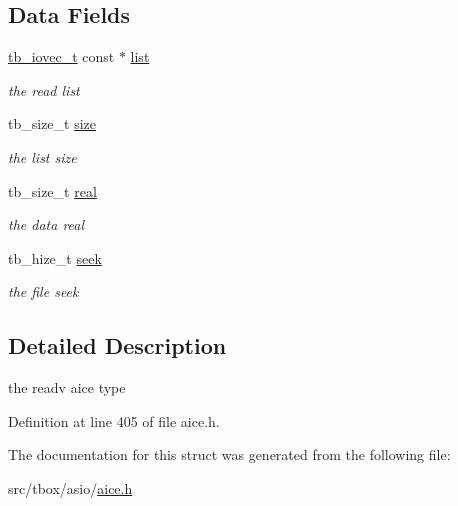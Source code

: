\subsection*{Data Fields}
\begin{DoxyCompactItemize}
\item 
\hypertarget{structtb__aice__readv__t_a9f43f5967de398a9f47b0350ff36e56f}{\hyperlink{structtb__iovec__t}{tb\-\_\-iovec\-\_\-t} const $\ast$ \hyperlink{structtb__aice__readv__t_a9f43f5967de398a9f47b0350ff36e56f}{list}}\label{structtb__aice__readv__t_a9f43f5967de398a9f47b0350ff36e56f}

\begin{DoxyCompactList}\small\item\em the read list \end{DoxyCompactList}\item 
\hypertarget{structtb__aice__readv__t_a02493a5f1e3e5f29f9240a25075d22cb}{tb\-\_\-size\-\_\-t \hyperlink{structtb__aice__readv__t_a02493a5f1e3e5f29f9240a25075d22cb}{size}}\label{structtb__aice__readv__t_a02493a5f1e3e5f29f9240a25075d22cb}

\begin{DoxyCompactList}\small\item\em the list size \end{DoxyCompactList}\item 
\hypertarget{structtb__aice__readv__t_a2e8bf3ab62e7ba587f0267350fd03dd0}{tb\-\_\-size\-\_\-t \hyperlink{structtb__aice__readv__t_a2e8bf3ab62e7ba587f0267350fd03dd0}{real}}\label{structtb__aice__readv__t_a2e8bf3ab62e7ba587f0267350fd03dd0}

\begin{DoxyCompactList}\small\item\em the data real \end{DoxyCompactList}\item 
\hypertarget{structtb__aice__readv__t_ae7d6b0fcbf4bc67cb93ce9338865b993}{tb\-\_\-hize\-\_\-t \hyperlink{structtb__aice__readv__t_ae7d6b0fcbf4bc67cb93ce9338865b993}{seek}}\label{structtb__aice__readv__t_ae7d6b0fcbf4bc67cb93ce9338865b993}

\begin{DoxyCompactList}\small\item\em the file seek \end{DoxyCompactList}\end{DoxyCompactItemize}


\subsection{Detailed Description}
the readv aice type 

Definition at line 405 of file aice.\-h.



The documentation for this struct was generated from the following file\-:\begin{DoxyCompactItemize}
\item 
src/tbox/asio/\hyperlink{aice_8h}{aice.\-h}\end{DoxyCompactItemize}
